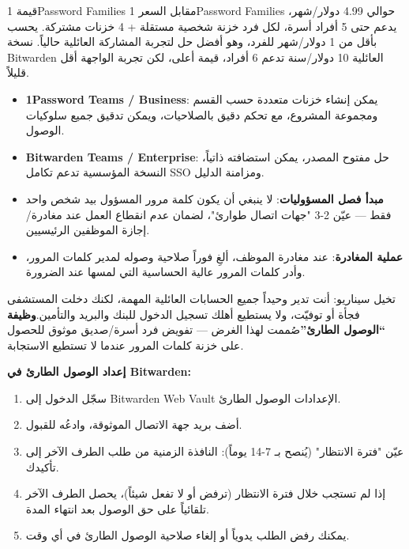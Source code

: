 \begin{tcbinfo}{قيمة 1Password Families مقابل السعر}
1Password Families حوالي 4.99 دولار/شهر، يدعم حتى 5 أفراد أسرة، لكل فرد خزنة شخصية مستقلة + 4 خزنات مشتركة. يحسب بأقل من 1 دولار/شهر للفرد، وهو أفضل حل لتجربة المشاركة العائلية حالياً. نسخة Bitwarden العائلية 10 دولار/سنة تدعم 6 أفراد، قيمة أعلى، لكن تجربة الواجهة أقل قليلاً.

\end{tcbinfo}


\begin{itemize}
  \item \textbf{1Password Teams / Business}: يمكن إنشاء خزنات متعددة حسب القسم ومجموعة المشروع، مع تحكم دقيق بالصلاحيات، ويمكن تدقيق جميع سلوكيات الوصول.
  \item \textbf{Bitwarden Teams / Enterprise}: حل مفتوح المصدر، يمكن استضافته ذاتياً، النسخة المؤسسية تدعم تكامل SSO ومزامنة الدليل.
  \item \textbf{مبدأ فصل المسؤوليات}: لا ينبغي أن يكون كلمة مرور المسؤول بيد شخص واحد فقط — عيّن 2-3 "جهات اتصال طوارئ"، لضمان عدم انقطاع العمل عند مغادرة/إجازة الموظفين الرئيسيين.
  \item \textbf{عملية المغادرة}: عند مغادرة الموظف، ألغِ فوراً صلاحية وصوله لمدير كلمات المرور، وأدر كلمات المرور عالية الحساسية التي لمسها عند الضرورة.
\end{itemize}


تخيل سيناريو: أنت تدير وحيداً جميع الحسابات العائلية المهمة، لكنك دخلت المستشفى فجأة أو توفيّت، ولا يستطيع أهلك تسجيل الدخول للبنك والبريد والتأمين.\textbf{وظيفة “الوصول الطارئ”}صُممت لهذا الغرض — تفويض فرد أسرة/صديق موثوق للحصول على خزنة كلمات المرور عندما لا تستطيع الاستجابة.

\textbf{إعداد الوصول الطارئ في Bitwarden:}

\begin{enumerate}
  \item سجّل الدخول إلى Bitwarden Web Vault الإعدادات الوصول الطارئ.
  \item أضف بريد جهة الاتصال الموثوقة، وادعُه للقبول.
  \item عيّن "فترة الانتظار" (يُنصح بـ 7-14 يوماً): النافذة الزمنية من طلب الطرف الآخر إلى تأكيدك.
  \item إذا لم تستجب خلال فترة الانتظار (ترفض أو لا تفعل شيئاً)، يحصل الطرف الآخر تلقائياً على حق الوصول بعد انتهاء المدة.
  \item يمكنك رفض الطلب يدوياً أو إلغاء صلاحية الوصول الطارئ في أي وقت.
\end{enumerate}

